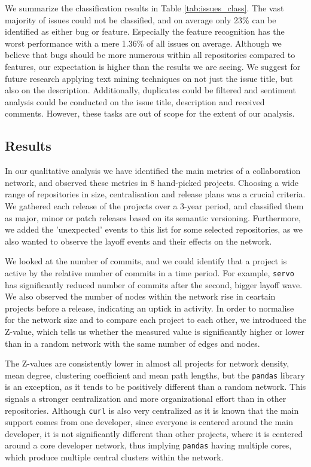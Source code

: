 We summarize the classification results in Table \ref{tab:issues_class}. The vast majority of issues could not be classified, and on average only 23\% can be identified as either bug or feature. Especially the feature recognition has the worst performance with a mere 1.36\% of all issues on average. Although we believe that bugs should be more numerous within all repositories compared to features, our expectation is higher than the results we are seeing. We suggest for future research applying text mining techniques on not just the issue title, but also on the description. Additionally, duplicates could be filtered and sentiment analysis could be conducted on the issue title, description and received comments. However, these tasks are out of scope for the extent of our analysis.

\subsection{Results}

In our qualitative analysis we have identified the main metrics of a collaboration network, and observed these metrics in 8 hand-picked projects. Choosing a wide range of repositories in size, centralisation and release plans was a crucial criteria. We gathered each release of the projects over a 3-year period, and classified them as major, minor or patch releases based on its semantic versioning. Furthermore, we added the 'unexpected' events to this list for some selected repositories, as we also wanted to observe the layoff events and their effects on the network.

We looked at the number of commits, and we could identify that a project is active by the relative number of commits in a time period. For example, \texttt{servo} has significantly reduced number of commits after the second, bigger layoff wave. We also observed the number of nodes within the network rise in ceartain projects before a release, indicating an uptick in activity. In order to normalise for the network size and to compare each project to each other, we introduced the Z-value, which tells us whether the measured value is significantly higher or lower than in a random network with the same number of edges and nodes.

The Z-values are consistently lower in almost all projects for network density, mean degree, clustering coefficient and mean path lengths, but the \texttt{pandas} library is an exception, as it tends to be positively different than a random network. This signals a stronger centralization and more organizational effort than in other repositories. Although \texttt{curl} is also very centralized as it is known that the main support comes from one developer, since everyone is centered around the main developer, it is not significantly different than other projects, where it is centered around a core developer network, thus implying \texttt{pandas} having multiple cores, which produce multiple central clusters within the network.

